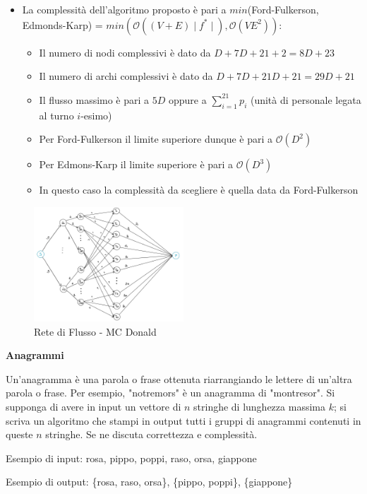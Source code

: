 \documentclass[../cheatSheetAlgoritmi.tex]{subfiles}
\begin{document}
\begin{itemize}
\begin{itemize}
	\end{itemize}
	\item La complessità dell'algoritmo proposto è pari a \hfill \break $min$(Ford-Fulkerson, Edmonds-Karp) = $min(\mathcal{O}((V + E) \mid f^{*} \mid), \mathcal{O}(VE^{2}))$:
		\begin{itemize}
			\item Il numero di nodi complessivi è dato da $D + 7D + 21 + 2 = 8D + 23$
			\item Il numero di archi complessivi è dato da $D + 7D + 21D + 21 = 29D + 21$
			\item Il flusso massimo è pari a $5D$ oppure a $\sum_{i = 1}^{21}p_{i}$ (unità di personale legata al turno $i$-esimo)
			\item Per Ford-Fulkerson il limite superiore dunque è pari a $\mathcal{O}(D^{2})$
			\item Per Edmons-Karp il limite superiore è pari a $\mathcal{O}(D^{3})$
			\item In questo caso la complessità da scegliere è quella data da Ford-Fulkerson
		\end{itemize}
\end{itemize}
\begin{figure}[H]
\caption{Rete di Flusso - MC Donald}
\centering
\includegraphics[width=0.5\textwidth]{../img/Locale_3.jpg}
\end{figure}
\textbf{Anagrammi}

Un'anagramma è una parola o frase ottenuta riarrangiando le lettere di un'altra parola o frase. Per esempio, "notremors" è un anagramma di "montresor". Si supponga di avere in input un vettore di $n$ stringhe di lunghezza massima $k$; si scriva un algoritmo che stampi in output tutti i gruppi di anagrammi contenuti in queste $n$ stringhe. Se ne discuta correttezza e complessità.

Esempio di input: rosa, pippo, poppi, raso, orsa, giappone

Esempio di output: \{rosa, raso, orsa\}, \{pippo, poppi\}, \{giappone\}
\end{document}
